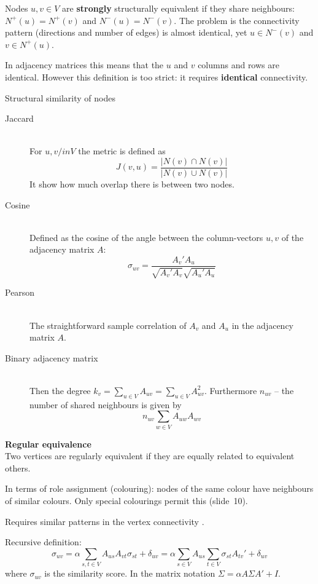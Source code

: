\documentclass[a4paper]{article}
\begin{document}
Nodes $u, v\in V$ are \textbf{strongly} structurally equivalent if they share neighbours: $N^+(u) = N^+(v)$ and $N^-(u) = N^-(v)$. The problem is the connectivity pattern (directions and number of edges) is almost identical, yet $u\in N^-(v)$ and $v\in N^+(u)$.

In adjacency matrices this means that the $u$ and $v$ columns and rows are identical. However this definition is too strict: it requires \textbf{identical} connectivity.

Structural similarity of nodes

\begin{description}
	\item[Jaccard] \hfill\\
	For $u,v/in V$ the metric is defined as \[J(v,u) = \frac{\big\lvert N(v) \cap N(v) \big\rvert}{\big\lvert N(v) \cup N(v) \big\rvert}\] It show how much overlap there is between two nodes.
	\item[Cosine] \hfill\\
	Defined as the cosine of the angle between the column-vectors $u,v$ of the adjacency matrix $A$:
	\[\sigma_{uv} = \frac{ A_v'A_u }{\sqrt{ A_v'A_v }\sqrt{ A_u'A_u }}\]
	\item[Pearson]\hfill\\
	The straightforward sample correlation of $A_v$ and $A_u$ in the adjacency matrix $A$.
	\item[Binary adjacency matrix] \hfill\\
	Then the degree $k_v = \sum_{u\in V} A_{uv} = \sum_{u\in V} A_{uv}^2$. Furthermore $n_{uv}$ -- the number of shared neighbours is given by 
	\[n_{uv}\sum_{w\in V} A_{uw}A_{wv}\]
\end{description}

\noindent\textbf{Regular equivalence}\hfill\\
Two vertices are regularly equivalent if they are equally related to equivalent others.

In terms of role assignment (colouring): nodes of the same colour have neighbours of similar colours. Only special colourings permit this (slide~10).


Requires similar patterns in the vertex connectivity .

Recursive definition:
\[\sigma_{uv} = \alpha \sum_{s,t\in V} A_{us} A_{vt} \sigma_{st} + \delta_{uv} = \alpha \sum_{s\in V} A_{us} \sum_{t\in V} \sigma_{st} A_{tv}' + \delta_{uv}\]
where $\sigma_{uv}$ is the similarity score. In the matrix notation $\Sigma = \alpha A\Sigma A' + I$.
\end{document}
